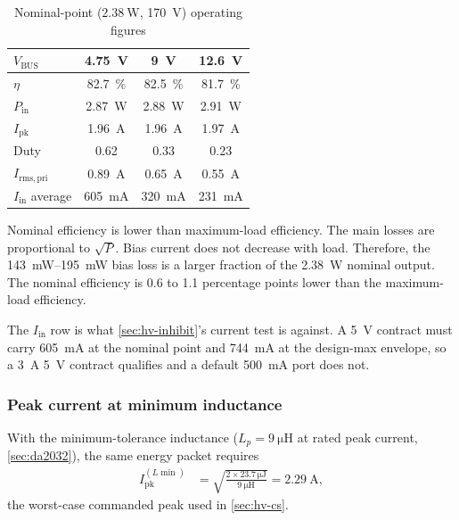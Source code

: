 {\footnotesize
  \begin{table}[htbp]
    \centering
    \caption{Nominal-point ($\SI{2.38}{\watt}$, \SI{170}{\volt}) operating figures}\label{tab:hv-nominal-line}
    \begin{tabular}{|l|c|c|c|}
      \hline
      $V_{\mathrm{BUS}}$ & \SI{4.75}{\volt} & \SI{9}{\volt} & \SI{12.6}{\volt} \\
      \hline
      $\eta$ & \SI{82.7}{\percent} & \SI{82.5}{\percent} & \SI{81.7}{\percent} \\
      \hline
      $P_{\mathrm{in}}$ & \SI{2.87}{\watt} & \SI{2.88}{\watt} & \SI{2.91}{\watt} \\
      \hline
      $I_{\mathrm{pk}}$ & \SI{1.96}{\ampere} & \SI{1.96}{\ampere} & \SI{1.97}{\ampere} \\
      \hline
      Duty & 0.62 & 0.33 & 0.23 \\
      \hline
      $I_{\mathrm{rms,pri}}$ & \SI{0.89}{\ampere} & \SI{0.65}{\ampere} & \SI{0.55}{\ampere} \\
      \hline
      $I_{\mathrm{in}}$ average & \SI{605}{\milli\ampere} & \SI{320}{\milli\ampere} &
      \SI{231}{\milli\ampere} \\
      \hline
    \end{tabular}
  \end{table}
}

Nominal efficiency is lower than maximum-load efficiency. The main losses are
proportional to $\sqrt{P}$. Bias current does not decrease with load. Therefore,
the \SIrange{143}{195}{\milli\watt} bias loss is a larger fraction of the
\SI{2.38}{\watt} nominal output. The nominal efficiency is
0.6 to 1.1 percentage points lower than the maximum-load efficiency.

The $I_{\mathrm{in}}$ row is what \cref{sec:hv-inhibit}'s current test is against.
A \SI{5}{\volt} contract must carry \SI{605}{\milli\ampere} at the nominal point
and \SI{744}{\milli\ampere} at the design-max envelope, so a
\SI{3}{\ampere} \SI{5}{\volt} contract qualifies and a default
\SI{500}{\milli\ampere} port does not.

\subsubsection{Peak current at minimum inductance}\label{sec:hv-op-lmin}

With the minimum-tolerance inductance ($L_p = \SI{9}{\micro\henry}$ at rated peak
current, \cref{sec:da2032}), the same energy packet requires
\begin{align*}
  I_{\mathrm{pk}}^{(L\min)} &= \sqrt{\frac{2 \times 23.7\,\si{\micro\joule}}
                                          {\SI{9}{\micro\henry}}}
                             = \SI{2.29}{\ampere},
\end{align*}
the worst-case commanded peak used in \cref{sec:hv-cs}.

